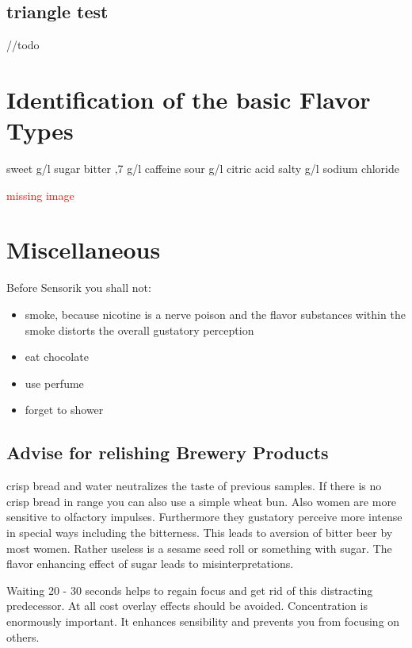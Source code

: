 \documentclass[]{scrartcl}
\begin{document}
\subsection{triangle test}
//todo


\section{Identification of the basic Flavor Types}
sweet  g/l sugar \newline
bitter ,7 g/l caffeine \newline
sour  g/l citric acid \newline
salty  g/l sodium chloride \newline

\textcolor{red}{missing image}


\newpage
\section{Miscellaneous}
Before Sensorik you shall not:
\begin{itemize}
  \item smoke, because nicotine is a nerve poison and the flavor substances within
  the smoke distorts the overall gustatory perception
  \item eat chocolate
  \item use perfume
  \item forget to shower
\end{itemize}

\subsection{Advise for relishing Brewery Products}
crisp bread and water neutralizes the taste of previous samples. If there is no crisp bread in range
you can also use a simple wheat bun.
Also women are more sensitive to olfactory impulses. Furthermore they gustatory perceive
more intense in special ways including the bitterness. This leads to aversion of bitter beer
by most women. Rather useless is a sesame seed roll or something with sugar.
The flavor enhancing effect of sugar leads to misinterpretations.

Waiting 20 - 30 seconds helps to regain focus and get rid of this distracting predecessor.
At all cost overlay effects should be avoided.
Concentration is enormously important. It enhances sensibility and prevents
you from focusing on others.
\end{document}
